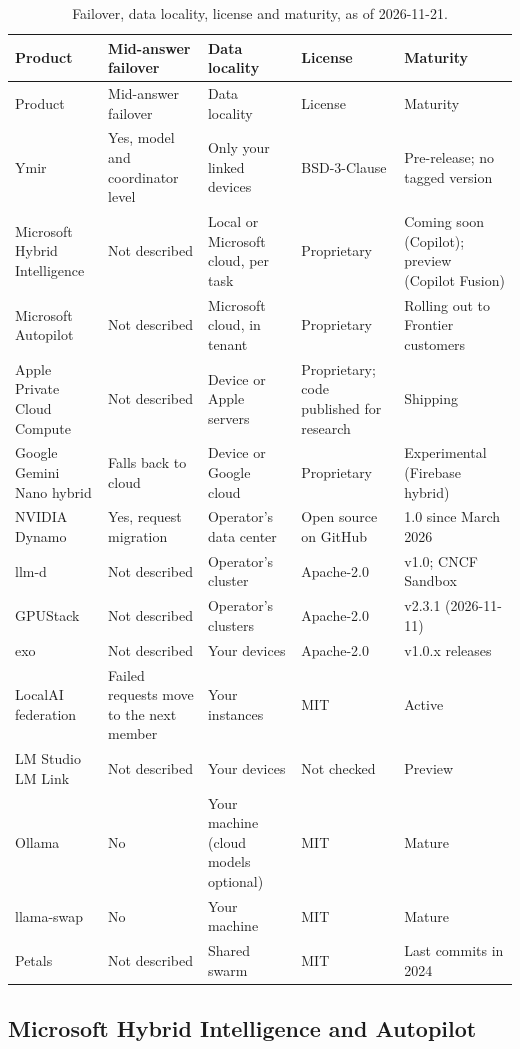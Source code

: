 {\begin{xltabular}{\linewidth}{@{}L{3.1cm}L{2.9cm}L{2.7cm}L{2.6cm}Y@{}}
\caption{Failover, data locality, license and maturity, as of 2026-11-21.}\\
\toprule
Product & Mid-answer failover & Data locality & License & Maturity \\
\midrule
\endfirsthead
\toprule
Product & Mid-answer failover & Data locality & License & Maturity \\
\midrule
\endhead
Ymir & Yes, model and coordinator level & Only your linked devices & BSD-3-Clause & Pre-release; no tagged version \\
Microsoft Hybrid Intelligence & Not described & Local or Microsoft cloud, per task & Proprietary & Coming soon (Copilot); preview (Copilot Fusion) \\
Microsoft Autopilot & Not described & Microsoft cloud, in tenant & Proprietary & Rolling out to Frontier customers \\
Apple Private Cloud Compute & Not described & Device or Apple servers & Proprietary; code published for research & Shipping \\
Google Gemini Nano hybrid & Falls back to cloud & Device or Google cloud & Proprietary & Experimental (Firebase hybrid) \\
NVIDIA Dynamo & Yes, request migration & Operator's data center & Open source on GitHub & 1.0 since March 2026 \\
llm-d & Not described & Operator's cluster & Apache-2.0 & v1.0; CNCF Sandbox \\
GPUStack & Not described & Operator's clusters & Apache-2.0 & v2.3.1 (2026-11-11) \\
exo & Not described & Your devices & Apache-2.0 & v1.0.x releases \\
LocalAI federation & Failed requests move to the next member & Your instances & MIT & Active \\
LM Studio LM Link & Not described & Your devices & Not checked & Preview \\
Ollama & No & Your machine (cloud models optional) & MIT & Mature \\
llama-swap & No & Your machine & MIT & Mature \\
Petals & Not described & Shared swarm & MIT & Last commits in 2024 \\
\bottomrule
\end{xltabular}
}

\subsection{Microsoft Hybrid Intelligence and Autopilot}\label{sec:cmp-microsoft}


